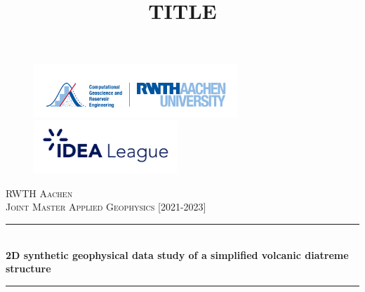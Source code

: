 \documentclass[11pt]{article}%
\title{TITLE}
\begin{document}
\begin{titlepage}


\begin{figure}[!tbp]
  \centering
  \begin{minipage}[b]{0.4\textwidth}
  \begin{flushleft}
    \includegraphics[height=2cm]{Titlepage_files/RWTH_CGGR_logo.png}
  \end{flushleft}
  \end{minipage}
  \hfill
  \begin{minipage}[b]{0.4\textwidth}
  \begin{flushright}
    \includegraphics[height=2cm]{Titlepage_files/IDEA_Leage_logo.png}
  \end{flushright}
  \end{minipage}
\end{figure}


\begin{center}
\newcommand{\HRule}{\rule{\linewidth}{0.5mm}} %
\textsc{\LARGE RWTH Aachen}\\[2cm]

\textsc{\Large Joint Master Applied Geophysics [2021-2023]}\\[2cm]

\HRule \\[0.5cm]
{ \huge \bfseries 2D synthetic geophysical data study of a simplified volcanic diatreme structure}\\[0.5cm]
\HRule \\[2cm]
\Large


\end{center}
\end{titlepage}
\end{document}
